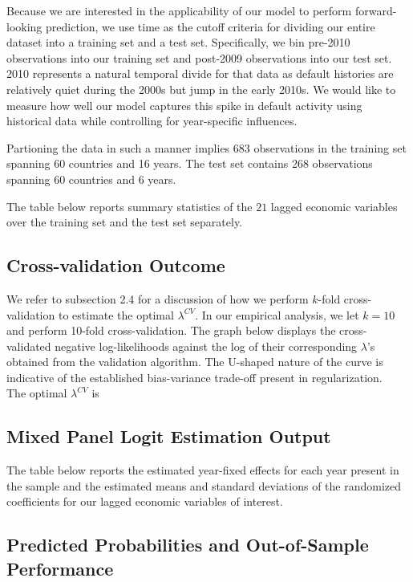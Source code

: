\documentclass[12pt]{article}
\begin{document}
Because we are interested in the applicability of our model to perform forward-looking prediction, we use time as the cutoff criteria for dividing our entire dataset into a training set and a test set. Specifically, we bin pre-2010 observations into our training set and post-2009 observations into our test set. 2010 represents a natural temporal divide for that data as default histories are relatively quiet during the 2000s but jump in the early 2010s. We would like to measure how well our model captures this spike in default activity using historical data while controlling for year-specific influences.

Partioning the data in such a manner implies 683 observations in the training set spanning 60 countries and 16 years. The test set contains 268 observations spanning 60 countries and 6 years. 

The table below reports summary statistics of the $21$ lagged economic variables over the training set and the test set separately.

\subsection{Cross-validation Outcome}

We refer to subsection 2.4 for a discussion of how we perform $k$-fold cross-validation to estimate the optimal $\lambda^{CV}$. In our empirical analysis, we let $k=10$ and perform 10-fold cross-validation. The graph below displays the cross-validated negative log-likelihoods against the log of their corresponding $\lambda$'s obtained from the validation algorithm. The U-shaped nature of the curve is indicative of the established bias-variance trade-off present in regularization. \\

The optimal $\lambda^{CV}$ is 

\subsection{Mixed Panel Logit Estimation Output}

The table below reports the estimated year-fixed effects for each year present in the sample and the estimated means and standard deviations of the randomized coefficients for our lagged economic variables of interest.

\subsection{Predicted Probabilities and Out-of-Sample Performance}
\end{document}
